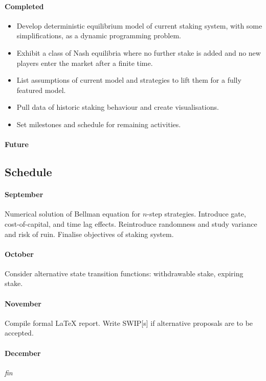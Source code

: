 \paragraph{Completed}
\begin{itemize}
  \item Develop deterministic equilibrium model of current staking system, with some simplifications, as a dynamic programming problem.
  \item Exhibit a class of Nash equilibria where no further stake is added and no new players enter the market after a finite time.
  \item List assumptions of current model and strategies to lift them for a fully featured model.
  \item Pull data of historic staking behaviour and create visualisations.
  \item Set milestones and schedule for remaining activities.
  \end{itemize}

\paragraph{Future}

\subsection*{Schedule}

\paragraph{September} Numerical solution of Bellman equation for $n$-step strategies. Introduce gate, cost-of-capital, and time lag effects. Reintroduce randomness and study variance and risk of ruin. Finalise objectives of staking system.

\paragraph{October} Consider alternative state transition functions: withdrawable stake, expiring stake.

\paragraph{November} Compile formal LaTeX report. Write SWIP[s] if alternative proposals are to be accepted.

\paragraph{December} \emph{fin}

